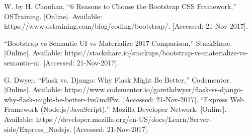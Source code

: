 \documentclass[onecolumn, draftclsnofoot,10pt, compsoc]{IEEEtran}
\begin{document}
\begin{thebibliography}{9}
W. by H. Chouhan, “6 Reasons to Choose the Bootstrap CSS Framework,” OSTraining. [Online]. Available: https://www.ostraining.com/blog/coding/bootstrap/. [Accessed: 21-Nov-2017].

“Bootstrap vs Semantic UI vs Materialize 2017 Comparison,” StackShare. [Online]. Available: https://stackshare.io/stackups/bootstrap-vs-materialize-vs-semantic-ui. [Accessed: 21-Nov-2017].

G. Dwyer, “Flask vs. Django: Why Flask Might Be Better,” Codementor. [Online]. Available: https://www.codementor.io/garethdwyer/flask-vs-django-why-flask-might-be-better-4xs7mdf8v. [Accessed: 21-Nov-2017].
“Express Web Framework (Node.js/JavaScript),” Mozilla Developer Network. [Online]. Available: https://developer.mozilla.org/en-US/docs/Learn/Server-side/Express\_Nodejs. [Accessed: 21-Nov-2017].



\end{thebibliography}
\end{document}
